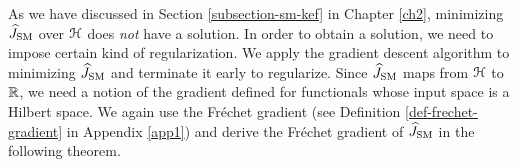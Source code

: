 %	
%	

As we have discussed in Section \ref{subsection-sm-kef} in Chapter \ref{ch2}, minimizing $\widehat{J}_{\mathrm{SM}}$ over $\mathcal{H}$ does \emph{not} have a solution. In order to obtain a solution, we need to impose certain kind of regularization. We apply the gradient descent algorithm to minimizing $\widehat{J}_{\mathrm{SM}}$ and terminate it early to regularize. Since $\widehat{J}_{\mathrm{SM}}$ maps from $\mathcal{H}$ to $\mathbb{R}$, we need a notion of the gradient defined for functionals whose input space is a Hilbert space. We again use the Fr{\'e}chet gradient (see Definition \ref{def-frechet-gradient} in Appendix \ref{app1}) and derive the Fr{\'e}chet gradient of $\widehat{J}_{\mathrm{SM}}$ in the following theorem. 

